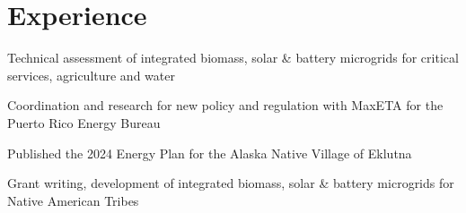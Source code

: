 \documentclass[]{deedy-resume-openfont}
\begin{document}
\begin{minipage}[t]{0.29\textwidth}


%
%

\end{minipage} 
\hfill
\begin{minipage}[t]{0.67\textwidth} 




\section{Experience} 
 \vspace{\topsep} %
\begin{tightemize}
\item Technical assessment of integrated biomass, solar \& battery microgrids for critical services, agriculture and water
\item Coordination and research for new policy and regulation with MaxETA for the Puerto Rico Energy Bureau
\end{tightemize}


\begin{tightemize}
\item Published the 2024 Energy Plan for the Alaska Native Village of Eklutna
\item Grant writing, development of integrated biomass, solar \& battery microgrids for Native American Tribes
\end{tightemize}


\end{minipage}
\end{document}
